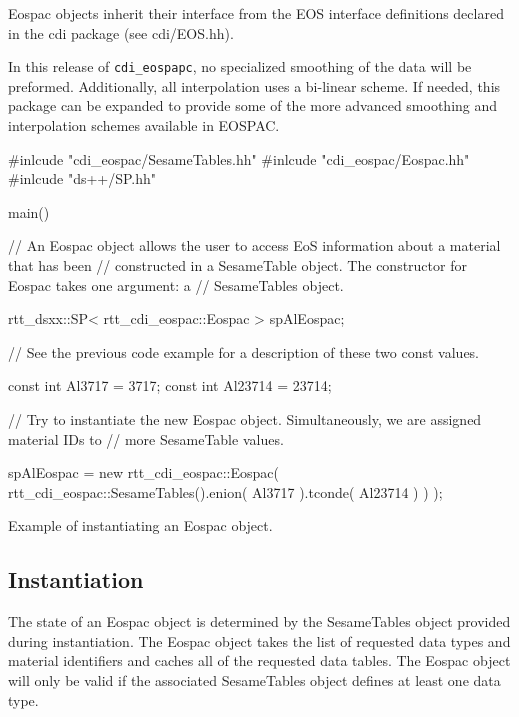 \documentclass[11pt]{nmemo}
\newenvironment{codeExample}
{\footnotesize 
  \VerbatimEnvironment
  \begin{SaveVerbatim}{\mycode}}%
  {\end{SaveVerbatim}%
  \noindent%
  \parashade[.950]{sharpcorners}{\gdef\outlineboxwidth{.5}%
    \UseVerbatim{\mycode}}\normalsize}
\begin{document}
Eospac objects inherit their interface from the EOS interface
definitions declared in the cdi package (see cdi/EOS.hh).

In this release of \texttt{cdi\_eospapc}, no specialized smoothing of
the data will be preformed.  Additionally, all interpolation uses a
bi-linear scheme.  If needed, this package can be expanded to provide
some of the more advanced smoothing and interpolation schemes
available in EOSPAC.



\begin{cxxSampleCode}
\begin{codeExample}
#inlcude "cdi_eospac/SesameTables.hh"
#inlcude "cdi_eospac/Eospac.hh"
#inlcude "ds++/SP.hh"

main()
{
  // An Eospac object allows the user to access EoS information about a material that has been 
  // constructed in a SesameTable object.  The constructor for Eospac takes one argument: a 
  // SesameTables object.
  
  rtt_dsxx::SP< rtt_cdi_eospac::Eospac > spAlEospac;

  // See the previous code example for a description of these two const values.

  const int Al3717  = 3717; const int Al23714 = 23714;

  // Try to instantiate the new Eospac object.  Simultaneously, we are assigned material IDs to
  // more SesameTable values.    
  
  spAlEospac = new 
    rtt_cdi_eospac::Eospac( rtt_cdi_eospac::SesameTables().enion( Al3717 ).tconde( Al23714 ) ) );
 } 
\end{codeExample}
\caption{Example of instantiating an Eospac object.}
\label{codeExample:EospacInstantiation}
\end{cxxSampleCode}

\subsection{Instantiation}

The state of an Eospac object is determined by the SesameTables object
provided during instantiation.  The Eospac object takes the list of
requested data types and material identifiers and caches all of the
requested data tables.  The Eospac object will only be valid if the
associated SesameTables object defines at least one data type.
\end{document}
